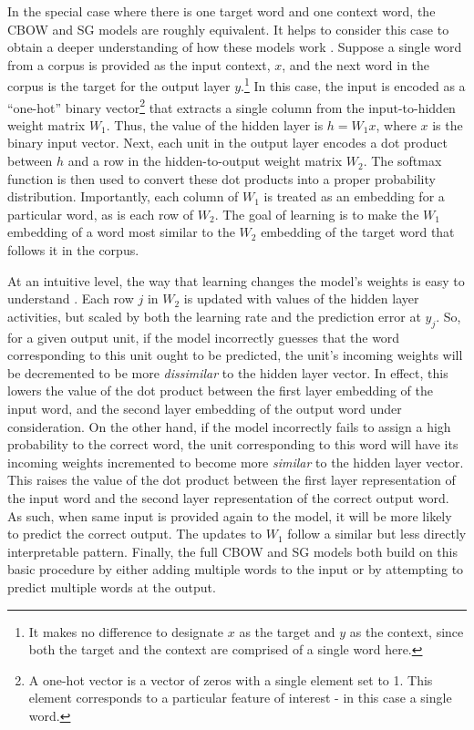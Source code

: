 In the special case where there is one target word and one context word, the CBOW and SG models are roughly equivalent. It helps to consider this case to obtain a deeper understanding of how these models work \citep[see][for further details]{Rong:2014}. Suppose a single word from a corpus is provided as the input context, $x$, and the next word in the corpus is the target for the output layer $y$.\footnote{It makes no difference to designate $x$ as the target and $y$ as the context, since both the target and the context are comprised of a single word here.} In this case, the input is encoded as a ``one-hot'' binary vector\footnote{A one-hot vector is a vector of zeros with a single element set to 1. This element corresponds to a particular feature of interest - in this case a single word.} that extracts a single column from the input-to-hidden weight matrix $W_1$. Thus, the value of the hidden layer is $h = W_1 x$, where $x$ is the binary input vector. Next, each unit in the output layer encodes a dot product between $h$ and a row in the hidden-to-output weight matrix $W_2$. The softmax function is then used to convert these dot products into a proper probability distribution. Importantly, each column of $W_1$ is treated as an embedding for a particular word, as is each row of $W_2$. The goal of learning is to make the $W_1$ embedding of a word most similar to the $W_2$ embedding of the target word that follows it in the corpus. 

At an intuitive level, the way that learning changes the model's weights is easy to understand \citep{Rong:2014}. Each row $j$ in $W_2$ is updated with values of the hidden layer activities, but scaled by both the learning rate and the prediction error at $y_j$. So, for a given output unit, if the model incorrectly guesses that the word corresponding to this unit ought to be predicted, the unit's incoming weights will be decremented to be more \textit{dissimilar} to the hidden layer vector. In effect, this lowers the value of the dot product between the first layer embedding of the input word, and the second layer embedding of the output word under consideration. On the other hand, if the model incorrectly fails to assign a high probability to the correct word, the unit corresponding to this word will have its incoming weights incremented to become more \textit{similar} to the hidden layer vector. This raises the value of the dot product between the first layer representation of the input word and the second layer representation of the correct output word. As such, when same input is provided again to the model, it will be more likely to predict the correct output. The updates to $W_1$ follow a similar but less directly interpretable pattern. Finally, the full CBOW and SG models both build on this basic procedure by either adding multiple words to the input or by attempting to predict multiple words at the output. 

